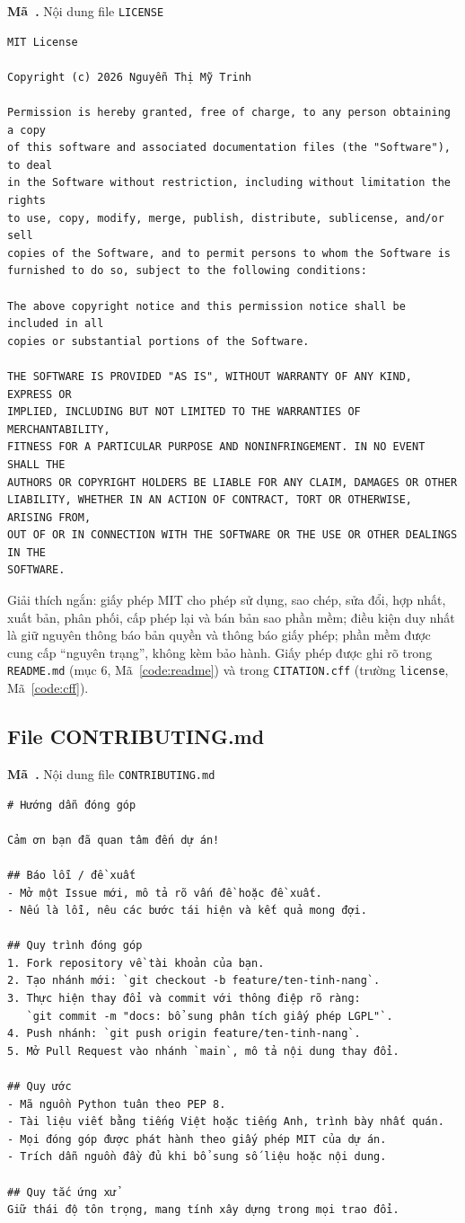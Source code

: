 \documentclass[12pt,a4paper]{article}
\newcounter{code}
\newcommand{\codecap}[2]{\refstepcounter{code}\label{#2}\par\vspace{4pt}\noindent\textbf{Mã~\thecode.} #1\par\nopagebreak\vspace{2pt}}
\newcommand{\fn}[1]{\texttt{#1}}
\begin{document}
\codecap{Nội dung file \fn{LICENSE}}{code:license}
\begin{Verbatim}
MIT License

Copyright (c) 2026 Nguyễn Thị Mỹ Trinh

Permission is hereby granted, free of charge, to any person obtaining a copy
of this software and associated documentation files (the "Software"), to deal
in the Software without restriction, including without limitation the rights
to use, copy, modify, merge, publish, distribute, sublicense, and/or sell
copies of the Software, and to permit persons to whom the Software is
furnished to do so, subject to the following conditions:

The above copyright notice and this permission notice shall be included in all
copies or substantial portions of the Software.

THE SOFTWARE IS PROVIDED "AS IS", WITHOUT WARRANTY OF ANY KIND, EXPRESS OR
IMPLIED, INCLUDING BUT NOT LIMITED TO THE WARRANTIES OF MERCHANTABILITY,
FITNESS FOR A PARTICULAR PURPOSE AND NONINFRINGEMENT. IN NO EVENT SHALL THE
AUTHORS OR COPYRIGHT HOLDERS BE LIABLE FOR ANY CLAIM, DAMAGES OR OTHER
LIABILITY, WHETHER IN AN ACTION OF CONTRACT, TORT OR OTHERWISE, ARISING FROM,
OUT OF OR IN CONNECTION WITH THE SOFTWARE OR THE USE OR OTHER DEALINGS IN THE
SOFTWARE.
\end{Verbatim}

Giải thích ngắn: giấy phép MIT cho phép sử dụng, sao chép, sửa đổi, hợp nhất, xuất bản, phân phối, cấp phép lại và bán bản sao phần mềm; điều kiện duy nhất là giữ nguyên thông báo bản quyền và thông báo giấy phép; phần mềm được cung cấp ``nguyên trạng'', không kèm bảo hành. Giấy phép được ghi rõ trong \fn{README.md} (mục 6, Mã~\ref{code:readme}) và trong \fn{CITATION.cff} (trường \fn{license}, Mã~\ref{code:cff}).

\subsection{File CONTRIBUTING.md}\label{sec:contrib}
\codecap{Nội dung file \fn{CONTRIBUTING.md}}{code:contrib}
\begin{Verbatim}
# Hướng dẫn đóng góp

Cảm ơn bạn đã quan tâm đến dự án!

## Báo lỗi / đề xuất
- Mở một Issue mới, mô tả rõ vấn đề hoặc đề xuất.
- Nếu là lỗi, nêu các bước tái hiện và kết quả mong đợi.

## Quy trình đóng góp
1. Fork repository về tài khoản của bạn.
2. Tạo nhánh mới: `git checkout -b feature/ten-tinh-nang`.
3. Thực hiện thay đổi và commit với thông điệp rõ ràng:
   `git commit -m "docs: bổ sung phân tích giấy phép LGPL"`.
4. Push nhánh: `git push origin feature/ten-tinh-nang`.
5. Mở Pull Request vào nhánh `main`, mô tả nội dung thay đổi.

## Quy ước
- Mã nguồn Python tuân theo PEP 8.
- Tài liệu viết bằng tiếng Việt hoặc tiếng Anh, trình bày nhất quán.
- Mọi đóng góp được phát hành theo giấy phép MIT của dự án.
- Trích dẫn nguồn đầy đủ khi bổ sung số liệu hoặc nội dung.

## Quy tắc ứng xử
Giữ thái độ tôn trọng, mang tính xây dựng trong mọi trao đổi.
\end{Verbatim}
\end{document}
